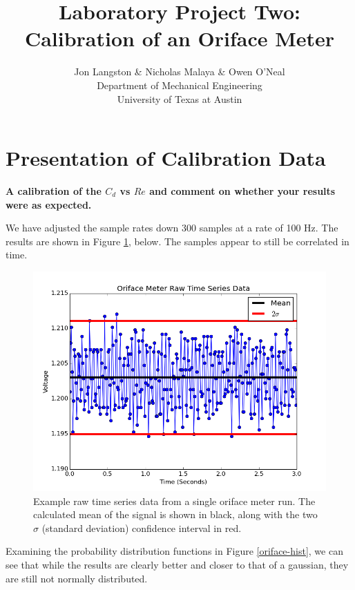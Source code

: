 \documentclass{article}
\title{\bf{Laboratory Project Two: Calibration of an Oriface Meter}}
\author{Jon Langston \& Nicholas Malaya \& Owen O'Neal \\ Department of Mechanical Engineering \\ University of Texas at Austin} \date{}
\begin{document}
\maketitle
\date{}
\newpage
\section{Presentation of Calibration Data}

\textbf{A calibration of the $C_d$ vs $Re$ and comment on whether your
results were as expected.}   

We have adjusted the sample rates down  300 samples at a rate of 100
Hz. The results are shown in Figure 
\ref{oriface-time}, below. The samples appear to still be correlated in
time. 


\begin{figure}[!htb]
  \begin{center}
    \includegraphics[width = 12 cm]{figs/oriface_time.png}
    \caption{Example raw time series data from a single oriface meter 
      run. The calculated mean of the signal is shown in black, along with
      the two $\sigma$ (standard deviation) confidence interval in
      red.}
    \label{oriface-time}
  \end{center}
\end{figure}

Examining the probability distribution functions in Figure \ref{oriface-hist},
we can see that while the results are clearly better and closer to that
of a gaussian, they are still not normally distributed. 
\end{document}
